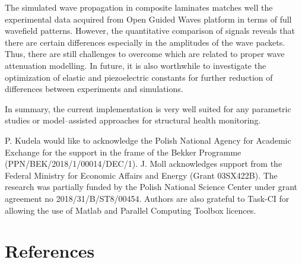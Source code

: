 \documentclass[12pt]{iopart}
\begin{document}
The simulated wave propagation in composite laminates matches well the experimental data acquired from Open Guided Waves platform in terms of full wavefield patterns. However, the quantitative comparison of signals reveals that there are certain differences especially in the amplitudes of the wave packets. Thus, there are still challenges to overcome which are related to proper wave attenuation modelling. In future, it is also worthwhile to investigate the optimization of elastic and piezoelectric constants for further reduction of differences between experiments and simulations.

In summary, the current implementation is very well suited for any parametric studies or model--assisted approaches for structural health monitoring.


\ack
P. Kudela would like to acknowledge the Polish National Agency for Academic Exchange for the support in the frame of the Bekker Programme (PPN/BEK/2018/1/00014/DEC/1). J. Moll acknowledges support from the Federal Ministry for
Economic Affairs and Energy (Grant 03SX422B). The research was partially funded by the Polish National Science Center under grant agreement no 2018/31/B/ST8/00454. Authors are also grateful to Task-CI for allowing the use of Matlab and Parallel Computing Toolbox licences. 

\section*{References}

\end{document}
